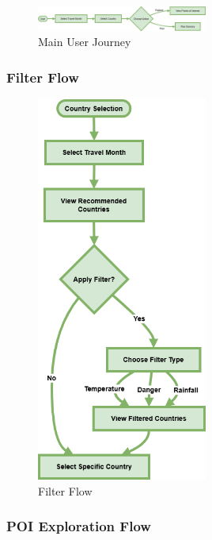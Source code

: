 \documentclass[]{project_final}
\begin{document}
\begin{figure}[ht!]
    \centering
    \includegraphics[width=0.5\textwidth]{TPMainUserJourney.drawio.png}
    \vspace*{0.0cm}
    \caption{Main User Journey}
    \label{fig:1}
\end{figure}

\newpage
\subsubsection{Filter Flow}

\begin{figure}[ht!]
    \centering
    \includegraphics[width=0.5\textwidth]{TPFilterFlow.png}
    \vspace*{0.0cm}
    \caption{Filter Flow}
    \label{fig:1}
\end{figure}

\newpage
\subsubsection{POI Exploration Flow}
\end{document}
